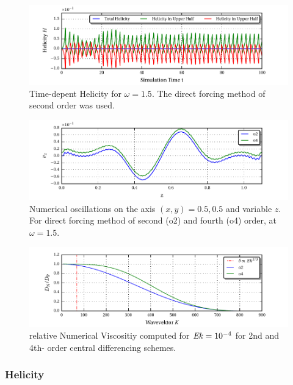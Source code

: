 \clearpage
\begin{figure}[!t]
  \centering
  \includegraphics{gfx/cone/cylinder/helicity.pdf}  \caption{
      Time-depent Helicity for $\omega=1.5$. The direct forcing method of second order was used.
      \label{cone:cyl_helicity}
      }
\end{figure}
\begin{figure}[!p]
  \centering
  \includegraphics{gfx/cone/cylinder/oscillations.pdf}  \caption{
      Numerical oscillations on the axis $(x,y) = 0.5, 0.5$ and variable $z$.
      For direct forcing method of second (o2) and fourth (o4) order, at $\omega=1.5$.
      \label{cone:cyl_oscillations}
      }
\end{figure}
\begin{figure}[!b]
  \centering
  \includegraphics{gfx/cone/cylinder/numvis.pdf}  \caption{
      relative Numerical Viscositiy computed for $\mbox{\textit{Ek}}=10^{-4}$ for 2nd and 4th- order central differencing schemes.
      \label{cone:cyl_numvis}
      }
\end{figure}
\clearpage

\subsubsection{Helicity}

